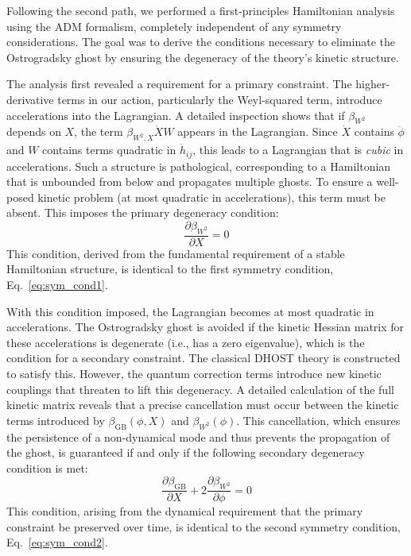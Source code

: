 \documentclass[twocolumn]{aastex631}
\begin{document}
Following the second path, we performed a first-principles Hamiltonian analysis using the ADM formalism, completely independent of any symmetry considerations. The goal was to derive the conditions necessary to eliminate the Ostrogradsky ghost by ensuring the degeneracy of the theory's kinetic structure.

The analysis first revealed a requirement for a primary constraint. The higher-derivative terms in our action, particularly the Weyl-squared term, introduce accelerations into the Lagrangian. A detailed inspection shows that if $\beta_{W^2}$ depends on $X$, the term $\beta_{W^2,X} \dot{X} W$ appears in the Lagrangian. Since $\dot{X}$ contains $\ddot{\phi}$ and $W$ contains terms quadratic in $\ddot{h}_{ij}$, this leads to a Lagrangian that is \textit{cubic} in accelerations. Such a structure is pathological, corresponding to a Hamiltonian that is unbounded from below and propagates multiple ghosts. To ensure a well-posed kinetic problem (at most quadratic in accelerations), this term must be absent. This imposes the primary degeneracy condition:
\begin{equation}
    \frac{\partial\beta_{W^2}}{\partial X} = 0
\end{equation}
This condition, derived from the fundamental requirement of a stable Hamiltonian structure, is identical to the first symmetry condition, Eq.~\eqref{eq:sym_cond1}.

With this condition imposed, the Lagrangian becomes at most quadratic in accelerations. The Ostrogradsky ghost is avoided if the kinetic Hessian matrix for these accelerations is degenerate (i.e., has a zero eigenvalue), which is the condition for a secondary constraint. The classical DHOST theory is constructed to satisfy this. However, the quantum correction terms introduce new kinetic couplings that threaten to lift this degeneracy. A detailed calculation of the full kinetic matrix reveals that a precise cancellation must occur between the kinetic terms introduced by $\beta_{\text{GB}}(\phi,X)$ and $\beta_{W^2}(\phi)$. This cancellation, which ensures the persistence of a non-dynamical mode and thus prevents the propagation of the ghost, is guaranteed if and only if the following secondary degeneracy condition is met:
\begin{equation}
    \frac{\partial\beta_{\text{GB}}}{\partial X} + 2 \frac{\partial\beta_{W^2}}{\partial\phi} = 0
\end{equation}
This condition, arising from the dynamical requirement that the primary constraint be preserved over time, is identical to the second symmetry condition, Eq.~\eqref{eq:sym_cond2}.
\end{document}
